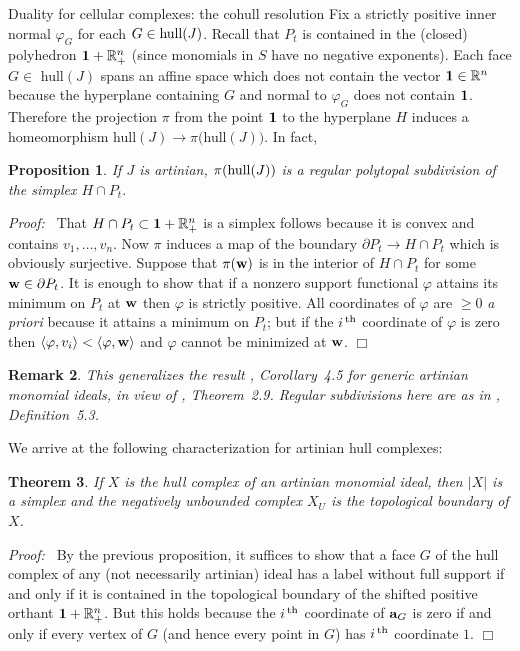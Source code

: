 \documentclass[12pt,leqno]{article}
\newtheorem{thm}{Theorem}[section]
\newtheorem{prop}[thm]{Proposition}
\newtheorem{remark}[thm]{Remark}
\def\<{{\langle}}
\def\>{{\rangle}}
\def\aa{{{\rm \bf a}}}
\def\ww{{{\rm \bf w}}}
\def\RR{{\mathbb R}}
\begin{document}
\begin{section}{Duality for cellular complexes: the cohull resolution}
Fix a strictly positive inner normal $\varphi_G$ for each $G \in {\rm
hull}(J)$.  Recall that $P_t$ is contained in the (closed) polyhedron
${\bf 1} + \RR_+^n$ (since monomials in $S$ have no negative exponents).
Each face $G \in$ hull$(J)$ spans an affine space which does not contain
the vector ${\bf 1} \in \RR^n$ because the hyperplane containing $G$ and
normal to $\varphi_G$ does not contain ${\bf 1}$.  Therefore the
projection $\pi$ from the point ${\bf 1}$ to the hyperplane $H$ induces a
homeomorphism hull$(J) \to \pi($hull$(J))$.  In fact,

\begin{prop} \label{prop:subdivision}
If $J$ is artinian, $\pi({\rm hull}(J))$ is a regular polytopal
subdivision of the simplex $H \cap P_t$.
\end{prop}
{\it Proof:\ } That $H \cap P_t \subset {\bf 1} + \RR_+^n$ is a simplex
follows because it is convex and contains $v_1,\ldots,v_n$.  Now $\pi$
induces a map of the boundary $\partial P_t \to H \cap P_t$ which is
obviously surjective.  Suppose that $\pi(\ww)$ is in the interior of $H
\cap P_t$ for some $\ww \in \partial P_t$.  It is enough to show that if
a nonzero support functional $\varphi$ attains its minimum on $P_t$ at
$\ww$ then $\varphi$ is strictly positive.  All coordinates of $\varphi$
are $\geq 0$ {\it a priori} because it attains a minimum on $P_t$; but if
the $i^{\rm \,th}$ coordinate of $\varphi$ is zero then $\<\varphi,v_i\>
< \<\varphi, \ww\>$ and $\varphi$ cannot be minimized at $\ww$.
%
\hfill
$\Box$

\begin{remark} This generalizes the result \cite{BPS}, Corollary~4.5 for
generic artinian monomial ideals, in view of \cite{BS}, Theorem~2.9.
Regular subdivisions here are as in \cite{Zie}, Definition~5.3.
\end{remark}

We arrive at the following characterization for artinian hull complexes:
\begin{thm} \label{thm:boundary}
If $X$ is the hull complex of an artinian monomial ideal, then $|X|$ is a
simplex and the negatively unbounded complex $X_U$ is the topological
boundary of $X$.
\end{thm}
{\it Proof:\ } By the previous proposition, it suffices to show that a
face $G$ of the hull complex of any (not necessarily artinian) ideal has
a label without full support if and only if it is contained in the
topological boundary of the shifted positive orthant ${\bf 1} + \RR_+^n$.
But this holds because the $i^{\,\rm th}$ coordinate of $\aa_G$ is zero
if and only if every vertex of $G$ (and hence every point in $G$) has
$i^{\,\rm th}$ coordinate $1$.
\hfill
$\Box$
\vskip 2mm


\end{section}
\end{document}
